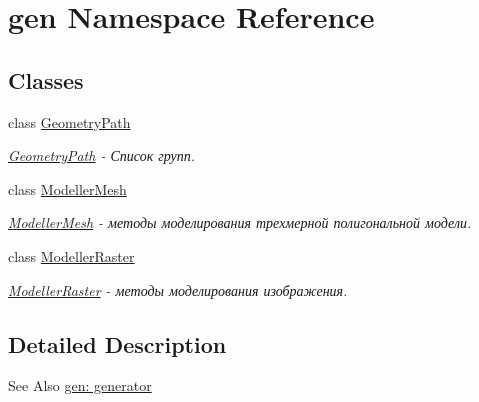 \hypertarget{namespacegen}{\section{gen Namespace Reference}
\label{namespacegen}
}
\subsection*{Classes}
\begin{DoxyCompactItemize}
\item 
class \hyperlink{classgen_1_1_geometry_path}{Geometry\-Path}
\begin{DoxyCompactList}\small\item\em \hyperlink{classgen_1_1_geometry_path}{Geometry\-Path} -\/ Список групп. \end{DoxyCompactList}\item 
class \hyperlink{classgen_1_1_modeller_mesh}{Modeller\-Mesh}
\begin{DoxyCompactList}\small\item\em \hyperlink{classgen_1_1_modeller_mesh}{Modeller\-Mesh} -\/ методы моделирования трехмерной полигональной модели. \end{DoxyCompactList}\item 
class \hyperlink{classgen_1_1_modeller_raster}{Modeller\-Raster}
\begin{DoxyCompactList}\small\item\em \hyperlink{classgen_1_1_modeller_raster}{Modeller\-Raster} -\/ методы моделирования изображения. \end{DoxyCompactList}\end{DoxyCompactItemize}


\subsection{Detailed Description}
\begin{DoxySeeAlso}{See Also}
\hyperlink{group__generator}{gen\-: generator} 
\end{DoxySeeAlso}
